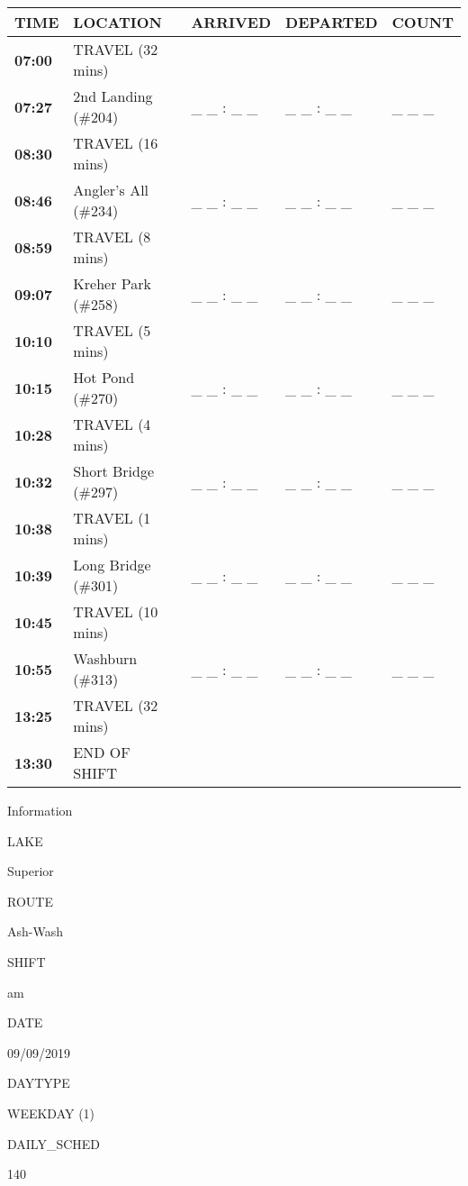 \documentclass[]{article}
\begin{document}
\begin{tabular}{>{\bfseries}lllll}
\toprule
\textbf{TIME} & \textbf{LOCATION} & \textbf{ARRIVED} & \textbf{DEPARTED} & \textbf{COUNT}\\
\midrule
07:00 & TRAVEL (32 mins) &  &  & \\
07:27 & 2nd Landing (\#204) & \_ \_ : \_ \_ & \_ \_ : \_ \_ & \_ \_ \_\\
08:30 & TRAVEL (16 mins) &  &  & \\
08:46 & Angler's All (\#234) & \_ \_ : \_ \_ & \_ \_ : \_ \_ & \_ \_ \_\\
08:59 & TRAVEL (8 mins) &  &  & \\
09:07 & Kreher Park (\#258) & \_ \_ : \_ \_ & \_ \_ : \_ \_ & \_ \_ \_\\
10:10 & TRAVEL (5 mins) &  &  & \\
10:15 & Hot Pond (\#270) & \_ \_ : \_ \_ & \_ \_ : \_ \_ & \_ \_ \_\\
10:28 & TRAVEL (4 mins) &  &  & \\
10:32 & Short Bridge (\#297) & \_ \_ : \_ \_ & \_ \_ : \_ \_ & \_ \_ \_\\
10:38 & TRAVEL (1 mins) &  &  & \\
10:39 & Long Bridge (\#301) & \_ \_ : \_ \_ & \_ \_ : \_ \_ & \_ \_ \_\\
10:45 & TRAVEL (10 mins) &  &  & \\
10:55 & Washburn (\#313) & \_ \_ : \_ \_ & \_ \_ : \_ \_ & \_ \_ \_\\
13:25 & TRAVEL (32 mins) &  &  & \\
13:30 & END OF SHIFT &  &  & \\
\bottomrule
\end{tabular}\newpage

Information

LAKE

Superior

ROUTE

Ash-Wash

SHIFT

am

DATE

09/09/2019

DAYTYPE

WEEKDAY (1)

DAILY\_SCHED

140

\vspace{24pt}
\end{document}
